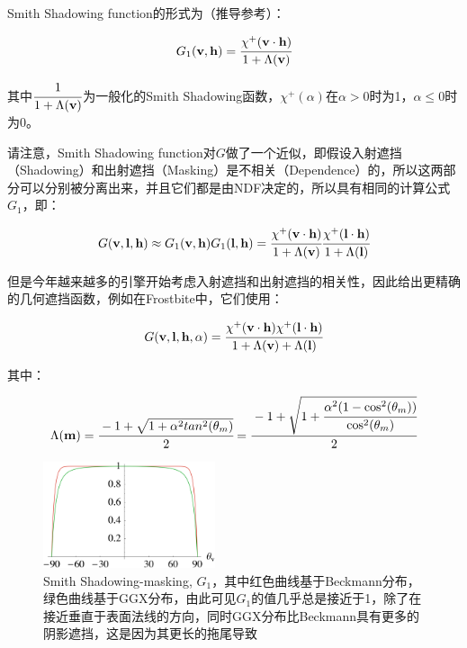 \begin{shaded*}
	Smith Shadowing function的形式为（推导参考\cite{a:UnderstandingtheMaskingShadowingFunctioninMicrofacetBasedBRDFs}）：
	
	\begin{equation}
		G_1(\mathbf{v},\mathbf{h})= \cfrac{\chi^{+}(\mathbf{v}\cdot\mathbf{h})}{1+\Lambda (\mathbf{v})}
	\end{equation}
	
	\noindent 其中$ \cfrac{1}{1+\Lambda (\mathbf{v})}$为一般化的Smith Shadowing函数，$\chi^{+}(\alpha)$在$\alpha>0$时为1，$\alpha\leq 0$时为0。
	
	请注意，Smith Shadowing function对$G$做了一个近似，即假设入射遮挡（Shadowing）和出射遮挡（Masking）是不相关（Dependence）的，所以这两部分可以分别被分离出来，并且它们都是由NDF决定的，所以具有相同的计算公式$G_1$，即：

\begin{equation}\label{eq:intro-smith-shadow-masking}
	G(\mathbf{v,\mathbf{l},\mathbf{h}})\approx G_1(\mathbf{v},\mathbf{h})G_1(\mathbf{l},\mathbf{h})= \cfrac{\chi^{+}(\mathbf{v}\cdot\mathbf{h})}{1+\Lambda (\mathbf{v})} \cfrac{\chi^{+}(\mathbf{l}\cdot\mathbf{h})}{1+\Lambda (\mathbf{l})}
\end{equation}

但是今年越来越多的引擎开始考虑入射遮挡和出射遮挡的相关性，因此给出更精确的几何遮挡函数，例如在Frostbite\cite{a:MovingFrostbitetoPBR}中，它们使用：

	\begin{equation}\label{eq:intro-correct-shadow-masking}
		G(\mathbf{v},\mathbf{l},\mathbf{h},\alpha)= \cfrac{\chi^{+}(\mathbf{v}\cdot\mathbf{h})\chi^{+}(\mathbf{l}\cdot\mathbf{h})}{1+\Lambda (\mathbf{v})+\Lambda (\mathbf{l})}
	\end{equation}

\noindent 其中：

\begin{equation}
	\Lambda (\mathbf{m})= \cfrac{-1+\sqrt{1+\alpha^2 tan^2 (\theta_m)}}{2}= \cfrac{-1+\sqrt{1+ \cfrac{\alpha^2 (1-\cos^2 (\theta_m))}{\cos^2 (\theta_m)}}}{2}
\end{equation}


\end{shaded*}


\begin{figure}
	\sidecaption
	\includegraphics[width=0.45\textwidth]{figures/intro/smith-shadowing-masking}
	\caption{Smith Shadowing-masking, $G_1$，其中红色曲线基于Beckmann分布，绿色曲线基于GGX分布，由此可见$G_1$的值几乎总是接近于1，除了在接近垂直于表面法线的方向，同时GGX分布比Beckmann具有更多的阴影遮挡，这是因为其更长的拖尾导致}
	\label{f:intro-smith-shadowing-masking}
\end{figure}



